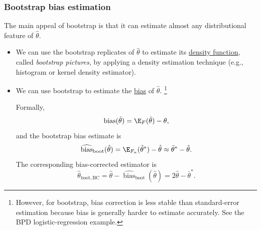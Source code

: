 \subsubsection{Bootstrap bias estimation}
The main appeal of bootstrap is that it can estimate almost any distributional feature of $\hat\theta$.
\begin{itemize}
    \item We can use the bootstrap replicates of $\hat\theta$ to estimate its \underline{density function}, called \emph{bootstrap pictures}, by applying a density estimation technique (e.g., histogram or kernel density estimator).
    \item We can use bootstrap to estimate the \underline{bias} of $\hat\theta$. 
    \footnote{However, for bootstrap, bias correction is less stable than standard-error estimation because bias is generally harder to estimate accurately. See the BPD logistic-regression example.}
    
    Formally,
    \[
        \operatorname{bias}(\hat\theta)=\E_F(\hat\theta)-\theta,
    \]
    and the bootstrap bias estimate is
    \[
        \widehat{\operatorname{bias}}_{\mathrm{boot}}(\hat\theta)
        =
        \E_{F_n}(\hat\theta^*)-\hat\theta
        \approx
        \bar\theta^*-\hat\theta.
    \]
    The corresponding bias-corrected estimator is
    \[
        \hat\theta_{\mathrm{boot,BC}}
        =
        \hat\theta-\widehat{\operatorname{bias}}_{\mathrm{boot}}(\hat\theta)
        =
        2\hat\theta-\bar\theta^*.
    \]
\end{itemize}
 


